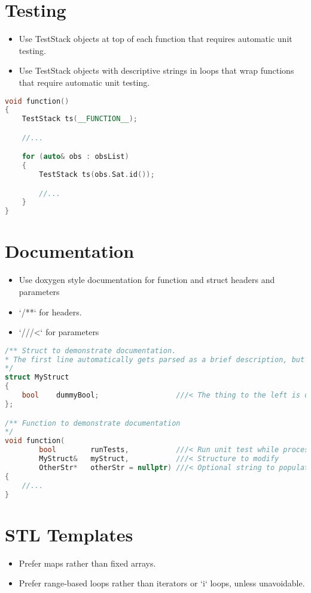 \section{Testing}
\begin{itemize}
	\item Use TestStack objects at top of each function that requires automatic unit testing.
	\item Use TestStack objects with descriptive strings in loops that wrap functions that require automatic unit testing.
\end{itemize}
\begin{lstlisting}[language=c++]
void function()
{
    TestStack ts(__FUNCTION__);

    //...

    for (auto& obs : obsList)
    {
        TestStack ts(obs.Sat.id());

        //...
    }
}
\end{lstlisting}
\section{Documentation}
\begin{itemize}
\item Use doxygen style documentation for function and struct headers and parameters
\item `/**`  for headers.
\item `///<` for parameters
\end{itemize}
\begin{lstlisting}[language=c++]
/** Struct to demonstrate documentation.
* The first line automatically gets parsed as a brief description, but more detailed descriptions are possible too.
*/
struct MyStruct
{
    bool    dummyBool;                  ///< The thing to the left is documented here
};

/** Function to demonstrate documentation
*/
void function(
        bool        runTests,           ///< Run unit test while processing
        MyStruct&   myStruct,           ///< Structure to modify
        OtherStr*	otherStr = nullptr)	///< Optional string to populate
{
   	//...
}
\end{lstlisting}

\section{STL Templates}
\begin{itemize}
\item Prefer maps rather than fixed arrays.
\item Prefer range-based loops rather than iterators or `i` loops, unless unavoidable.
\end{itemize}

